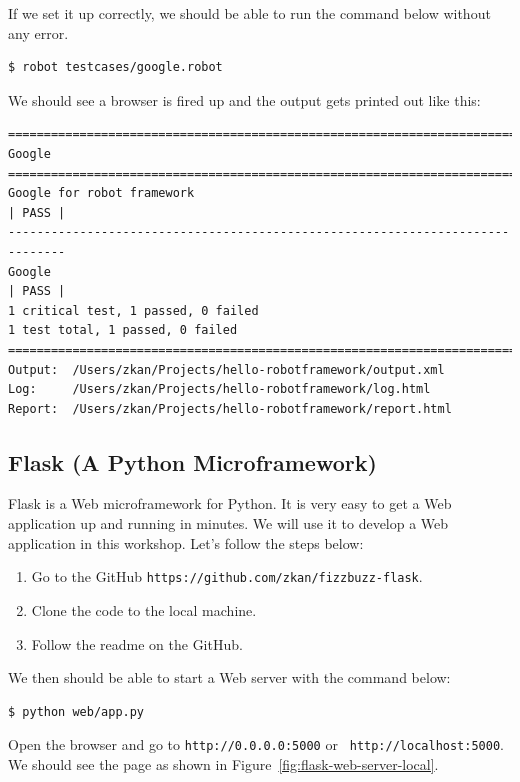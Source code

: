 \documentclass{article}
\begin{document}
\noindent If we set it up correctly, we should be able to run the command below
without any error.

\begin{verbatim}
$ robot testcases/google.robot
\end{verbatim}

\noindent We should see a browser is fired up and the output gets printed out
like this:

\begin{verbatim}
==============================================================================
Google
==============================================================================
Google for robot framework                                            | PASS |
------------------------------------------------------------------------------
Google                                                                | PASS |
1 critical test, 1 passed, 0 failed
1 test total, 1 passed, 0 failed
==============================================================================
Output:  /Users/zkan/Projects/hello-robotframework/output.xml
Log:     /Users/zkan/Projects/hello-robotframework/log.html
Report:  /Users/zkan/Projects/hello-robotframework/report.html
\end{verbatim}

\subsection*{Flask (A Python Microframework)}

\noindent Flask is a Web microframework for Python. It is very easy to get a
Web application up and running in minutes. We will use it to develop a Web
application in this workshop. Let's follow the steps below:

\begin{enumerate}
  \item Go to the GitHub {\tt https://github.com/zkan/fizzbuzz-flask}.
  \item Clone the code to the local machine.
  \item Follow the readme on the GitHub.
\end{enumerate}

\noindent We then should be able to start a Web server with the command below:

\begin{verbatim}
$ python web/app.py
\end{verbatim}

\noindent Open the browser and go to {\tt http://0.0.0.0:5000} or {\tt
http://localhost:5000}. We should see the page as shown in
Figure~\ref{fig:flask-web-server-local}. \\
\end{document}
